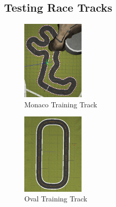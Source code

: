 \documentclass[journal]{IEEEtran}
\begin{document}
\subsection{Testing Race Tracks}
\begin{figure}[htbp]
\begin{center}
\includegraphics[width=3cm]{trainingTrack2}
\end{center}
\vspace{-1mm}
\caption{Monaco Training Track}
\label{monaco}
\end{figure}


\begin{figure}[htbp]
\begin{center}
\includegraphics[width=3cm]{trainingTrack3}
\end{center}
\vspace{-1mm}
\caption{Oval Training Track}
\label{oval}
\end{figure}
\end{document}
